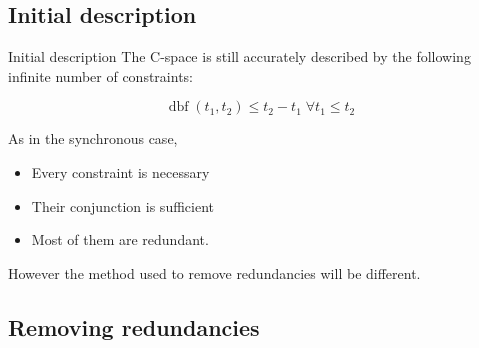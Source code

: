 \documentclass{beamer}
\newcommand{\dbf}[1]{\operatorname{dbf}(#1)}
\begin{document}
    \subsection{Initial description}

	\begin{frame}{Initial description}
		The C-space is still accurately described by the following infinite number of constraints:

        $$\dbf{t_1, t_2} \leq t_2 - t_1 \; \forall t_1 \leqslant  t_2$$

        As in the synchronous case,
        \begin{itemize}
            \item Every constraint is necessary
            \item Their conjunction is sufficient
            \item Most of them are redundant.
        \end{itemize}
        However the method used to remove redundancies will be different.
	\end{frame}

    \subsection{Removing redundancies}
\end{document}
